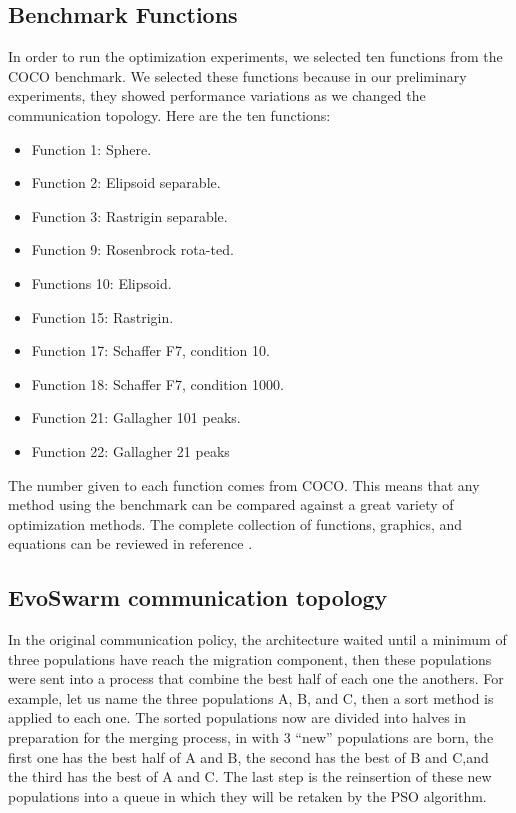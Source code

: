 \documentclass[runningheads]{llncs}
\begin{document}
\subsection{Benchmark Functions}
In order to run the optimization experiments, we selected ten functions from the COCO benchmark. We selected these functions because in our preliminary experiments, they showed performance variations as we changed the communication topology. Here are the ten functions:
\begin{multicols}{2}
\begin{itemize}

    \item Function 1: Sphere.
    \item Function 2: Elipsoid separable.
    \item Function 3: Rastrigin separable.
    \item Function 9: Rosenbrock rota-ted.
    \item Functions 10: Elipsoid.
    \item Function 15: Rastrigin.
    \item Function 17: Schaffer F7, condition 10.
    \item Function 18: Schaffer F7, condition 1000.
    \item Function 21: Gallagher 101 peaks.
    \item Function 22: Gallagher 21 peaks

\end{itemize}
\end{multicols}

The number given to each function comes from COCO. This means that any method using the benchmark can be compared against a great variety of optimization methods. The complete collection of functions, graphics, and equations can be reviewed in reference \cite{bbob}.

\subsection{EvoSwarm communication topology} %

In the original communication policy, the architecture waited until a minimum of
three populations have reach the migration component, then these populations
were sent into a process that combine the best half of each one the anothers.
For example, let us name the three populations A, B, and C, then a sort method
is applied to each one. The sorted populations now are divided into halves in
preparation for the merging process, in with 3 “new” populations are born, the
first one has the best half of A and B, the second has the best of B and C,and
the third has the best of A and C. The last step is the reinsertion of these new
populations into a queue in which they will be retaken by the PSO algorithm.
\end{document}
